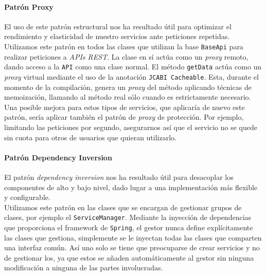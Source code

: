 \documentclass[../ei103948-project-documentation.tex]{subfiles}
\begin{document}
                        \paragraph{Patrón Proxy}
                        El uso de este patrón estructural nos ha resultado útil para optimizar el rendimiento y elasticidad de nuestro servicios ante peticiones repetidas.\\
            
                        Utilizamos este patrón en todos las clases que utilizan la base \texttt{BaseApi} para realizar peticiones a \textit{APIs REST}. La clase en sí actúa como un \textit{proxy} remoto, dando acceso a la \texttt{API} como una clase normal. El método \texttt{getData} actúa como un \textit{proxy} virtual mediante el uso de la anotación \texttt{JCABI Cacheable}. Esta, durante el momento de la compilación, genera un \textit{proxy} del método aplicando técnicas de memoización, llamando al método real sólo cuando es estrictamente necesario.\\
                        
                        Una posible mejora para estos  tipos de servicios, que aplicaría de nuevo este patrón, sería aplicar también el patrón de \textit{proxy} de protección. Por ejemplo, limitando las peticiones por segundo, asegurarnos así que el servicio no se quede sin cuota para otros de usuarios que quieran utilizarlo.
            
            
                        \paragraph{Patrón Dependency Inversion}
                        El patrón \textit{dependency inversion} nos ha resultado útil para desacoplar los componentes de alto y bajo nivel, dado lugar a una implementación más flexible y configurable.\\
            
                        Utilizamos este patrón en las clases que se encargan de gestionar grupos de clases, por ejemplo el \texttt{ServiceManager}. Mediante la inyección de dependencias que proporciona el framework de \texttt{Spring}, el gestor nunca define explícitamente las clases que gestiona, simplemente se le inyectan todas las clases que comparten una interfaz común. Así uno solo se tiene que preocuparse de crear servicios y no de gestionar los, ya que estos se añaden automáticamente al gestor sin ninguna modificación a ninguna de las partes involucradas.
            
\end{document}
